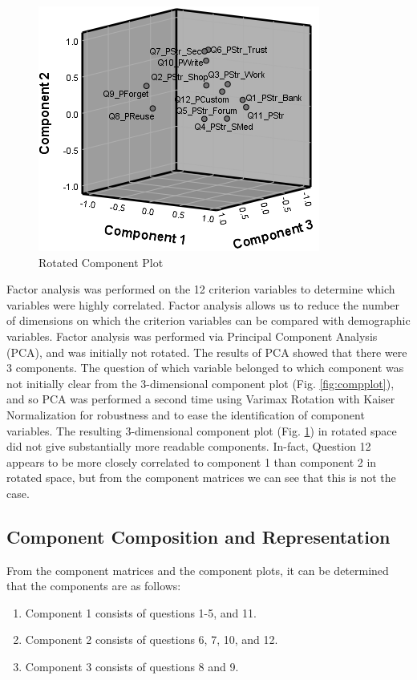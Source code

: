 \documentclass[letterpaper, 10 pt, conference]{ieeeconf}  %
\begin{document}
\begin{figure}[thpb]
  \centering
    \includegraphics[scale=0.84]{compplotrot.PNG}
  \caption{Rotated Component Plot}
  \label{fig:compplotrot}
\end{figure}

Factor analysis was performed on the 12 criterion variables to determine which variables were highly correlated. Factor analysis allows us to reduce the number of dimensions on which the criterion variables can be compared with demographic variables. Factor analysis was performed via Principal Component Analysis (PCA), and was initially not rotated. The results of PCA showed that there were 3 components. The question of which variable belonged to which component was not initially clear from the 3-dimensional component plot (Fig. \ref{fig:compplot}), and so PCA was performed a second time using Varimax Rotation with Kaiser Normalization for robustness and to ease the identification of component variables. The resulting 3-dimensional component plot (Fig. \ref{fig:compplotrot}) in rotated space did not give substantially more readable components. In-fact, Question 12 appears to be more closely correlated to component 1 than component 2 in rotated space, but from the component matrices we can see that this is not the case. 

\subsection{Component Composition and Representation}

From the component matrices and the component plots, it can be determined that the components are as follows:

\begin{enumerate}
\item 	Component 1 consists of questions 1-5, and 11.
\item 	Component 2 consists of questions 6, 7, 10, and 12.
\item 	Component 3 consists of questions 8 and 9.
\end{enumerate}
\end{document}
